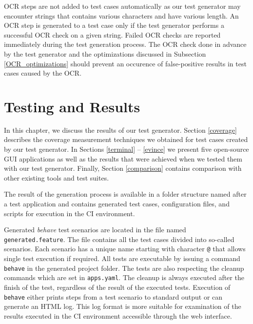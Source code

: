 OCR steps are not added to test cases automatically as our test generator may encounter strings that contains various characters and have various length. An OCR step is generated to a test case only if the test generator performs a successful OCR check on a given string. Failed OCR checks are reported immediately during the test generation process. The OCR check done in advance by the test generator and the optimizations discussed in Subsection \ref{OCR_optimizations} should prevent an occurence of false-positive results in test cases caused by the OCR. 



\chapter{Testing and Results}
In this chapter, we discuss the results of our test generator. Section \ref{coverage} describes the coverage measurement techniques we obtained for test cases created by our test generator.  In Sections \ref{terminal} -- \ref{evince} we present five open-source GUI applications as well as the results that were achieved when we tested them with our test generator. Finally, Section \ref{comparison} contains comparison with other existing tools and test suites.

The result of the generation process is available in a folder structure named after a test application and contains generated test cases, configuration files, and scripts for execution in the CI environment. 

Generated \textit{behave} test scenarios are located in the file named \texttt{generated.feature}. The file contains all the test cases divided into so-called scenarios. Each scenario has a unique name starting with character \texttt{@} that allows single test execution if required. All tests are executable by issuing a command \texttt{behave} in the generated project folder. The tests are also respecting the cleanup commands which are set in \texttt{apps.yaml}. The cleanup is always executed after the finish of the test, regardless of the result of the executed tests. Execution of \texttt{behave} either prints steps from a test scenario to standard output or can generate an HTML log. This log format is more suitable for examination of the results executed in the CI environment accessible through the web interface. 

